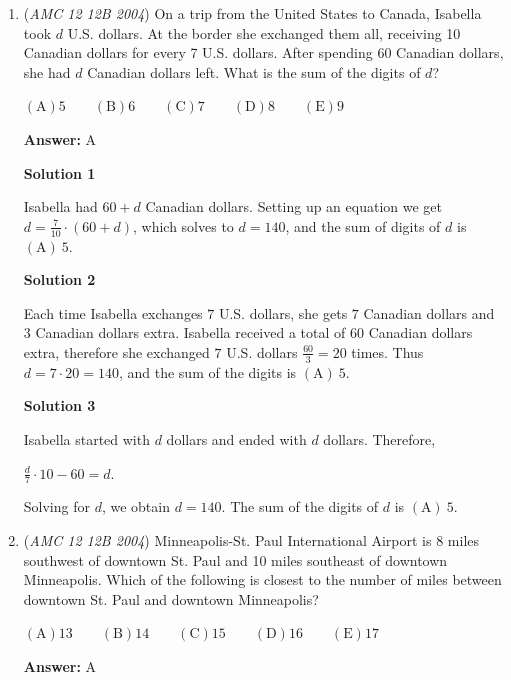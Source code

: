 \begin{enumerate}
 


	\item (\textit{AMC 12 12B 2004}) On a trip from the United States to Canada, Isabella took $d$ U.S. dollars. At the border she exchanged them all, receiving 10 Canadian dollars for every 7 U.S. dollars. After spending 60 Canadian dollars, she had $d$ Canadian dollars left. What is the sum of the digits of $d$? 


 $(\mathrm {A}) 5\qquad (\mathrm {B}) 6 \qquad (\mathrm {C}) 7 \qquad (\mathrm {D}) 8 \qquad (\mathrm {E}) 9$

 \textbf{Answer: }A



\textbf{Solution 1}

Isabella had $60+d$ Canadian dollars. Setting up an equation we get $d=\frac{7}{10}\cdot(60+d)$, which solves to $d=140$, and the sum of digits of $d$ is $\boxed{\mathrm{(A)}\ 5}$.

 



\textbf{Solution 2}

Each time Isabella exchanges $7$ U.S. dollars, she gets $7$ Canadian dollars and $3$ Canadian dollars extra. Isabella received a total of $60$ Canadian dollars extra, therefore she exchanged $7$ U.S. dollars $\frac{60}{3}=20$ times. Thus $d=7\cdot20=140$, and the sum of the digits is $\boxed{\mathrm{(A)}\ 5}$.

 



\textbf{Solution 3}

Isabella started with $d$ dollars and ended with $d$ dollars. Therefore,

 $\frac{d}{7}\cdot10-60=d$.

 Solving for $d$, we obtain $d = 140$. The sum of the digits of $d$ is $\boxed{\mathrm{(A)}\ 5}$.

 


	\item (\textit{AMC 12 12B 2004}) Minneapolis-St. Paul International Airport is 8 miles southwest of downtown St. Paul and 10 miles southeast of downtown Minneapolis. Which of the following is closest to the number of miles between downtown St. Paul and downtown Minneapolis? 


 $(\mathrm {A}) 13\qquad (\mathrm {B}) 14 \qquad (\mathrm {C}) 15 \qquad (\mathrm {D}) 16 \qquad (\mathrm {E}) 17$

 \textbf{Answer: }A




\end{enumerate}
